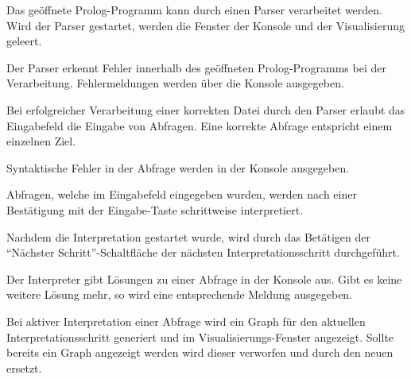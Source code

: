 \documentclass[parskip=full,11pt,twoside]{scrartcl}
\begin{document}
Das geöffnete Prolog-Programm kann durch einen Parser verarbeitet werden. Wird der Parser gestartet, werden die Fenster der Konsole und der Visualisierung geleert.


Der Parser erkennt Fehler innerhalb des geöffneten Prolog-Programms bei der Verarbeitung. Fehlermeldungen werden über die Konsole ausgegeben.


Bei erfolgreicher Verarbeitung einer korrekten Datei durch den Parser erlaubt das Eingabefeld die Eingabe von Abfragen. Eine korrekte Abfrage entspricht einem einzelnen Ziel.


Syntaktische Fehler in der Abfrage werden in der Konsole ausgegeben.


Abfragen, welche im Eingabefeld eingegeben wurden, werden nach einer Bestätigung mit der Eingabe-Taste schrittweise interpretiert.


Nachdem die Interpretation gestartet wurde, wird durch das Betätigen der \enquote{Nächster Schritt}-Schaltfläche der nächsten Interpretationsschritt durchgeführt.

\newpage
{}

Der Interpreter gibt Lösungen zu einer Abfrage in der Konsole aus. Gibt es keine weitere Lösung mehr, so wird eine entsprechende Meldung ausgegeben.


Bei aktiver Interpretation einer Abfrage wird ein Graph für den aktuellen Interpretationsschritt generiert und im Visualisierungs-Fenster angezeigt. Sollte bereits ein Graph angezeigt werden wird dieser verworfen und durch den neuen ersetzt.

\end{document}
